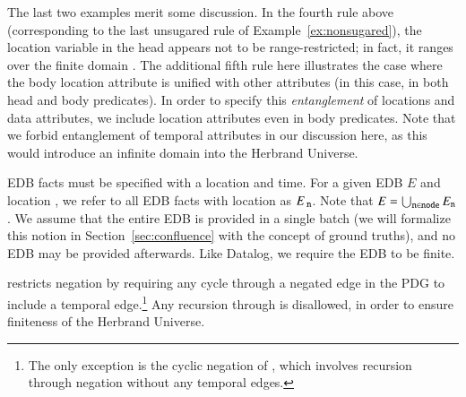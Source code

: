 The last two examples merit some discussion.  In the fourth rule above (corresponding to the last unsugared rule of Example~\ref{ex:nonsugared}), the location variable in the head appears not to be range-restricted; in fact, it ranges over the finite domain .  The additional fifth rule here illustrates the case where the body location attribute is unified with other attributes (in this case, in both head and body predicates).  In order to specify this \textit{entanglement} of locations and data attributes, we include location attributes even in body predicates. 
Note that we forbid entanglement of temporal attributes in our discussion here, as this would introduce an infinite domain into the Herbrand Universe.


\vspace{1em}
EDB facts must be specified with a location and time.  For a given EDB $E$ and location , we refer to all EDB facts with location  as $E_{\text{ \dedalus{{\scriptsize n}}}}$.  Note that $E = \bigcup_{\text{\dedalus{{\scriptsize n}}} \in \text{\dedalus{{\scriptsize node}}}} E_{\text{\dedalus{{\scriptsize n}}}}$.  We assume that the entire EDB is provided in a single batch
(we will formalize this notion in Section~\ref{sec:confluence} with the concept of
ground truths), and no EDB may be provided afterwards.  Like Datalog, we require the EDB to be finite.

\vspace{1em}
\lang restricts negation by requiring any cycle through a negated edge in the PDG to include a temporal edge.\footnote{The only exception is the cyclic negation of , which involves recursion through negation without any temporal edges.}  Any recursion through  is disallowed, in order to ensure finiteness of the Herbrand Universe.  %



